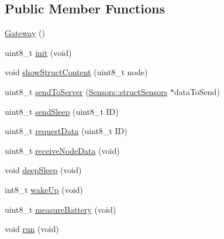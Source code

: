 \subsection*{Public Member Functions}
\begin{DoxyCompactItemize}
\item 
\hyperlink{class_gateway_aa46c059aeda74c7d47dfa40ad521b1d5}{Gateway} ()
\item 
uint8\+\_\+t \hyperlink{class_gateway_a5d219c9a9ec19e653be48f8832c83285}{init} (void)
\item 
void \hyperlink{class_gateway_a5b3639ce998f2cbaad5c753ad4983993}{show\+Struct\+Content} (uint8\+\_\+t node)
\item 
uint8\+\_\+t \hyperlink{class_gateway_ae6ea194466065c5e16573194b954d56e}{send\+To\+Server} (\hyperlink{struct_sensors_1_1struct_sensors}{Sensors\+::struct\+Sensors} $\ast$data\+To\+Send)
\item 
uint8\+\_\+t \hyperlink{class_gateway_adbe66d7a9769448ddd15aebe892aac25}{send\+Sleep} (uint8\+\_\+t ID)
\item 
uint8\+\_\+t \hyperlink{class_gateway_a92a7418ac3c22ed518d3638f35e94ed2}{request\+Data} (uint8\+\_\+t ID)
\item 
uint8\+\_\+t \hyperlink{class_gateway_a10c7b8bea8c3677acb51f3d6bc632729}{receive\+Node\+Data} (void)
\item 
void \hyperlink{class_gateway_a38cd1f8c0490b671f176c0c268a67f09}{deep\+Sleep} (void)
\item 
int8\+\_\+t \hyperlink{class_gateway_aeeb4507e5da1ab2e991278021abd1dc7}{wake\+Up} (void)
\item 
uint8\+\_\+t \hyperlink{class_gateway_a9d34fa93e382ed6e6289efe29e7ea6d0}{measure\+Battery} (void)
\item 
void \hyperlink{class_gateway_aaf583390ac930e8bd513ca97fe59ba31}{run} (void)
\end{DoxyCompactItemize}
